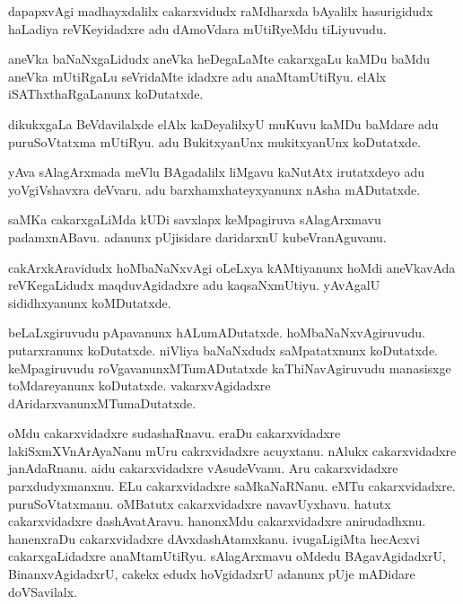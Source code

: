\documentclass{article}
\begin{document}
\begin{mn}%
dapapxvAgi madhayxdalilx cakarxvidudx raMdharxda bAyalilx hasurigidudx haLadiya reVKeyidadxre adu 
dAmoVdara mUtiRyeMdu tiLiyuvudu.
\end{mn}

\begin{mn}%
aneVka baNaNxgaLidudx aneVka heDegaLaMte cakarxgaLu kaMDu baMdu aneVka mUtiRgaLu seVridaMte 
idadxre adu anaMtamUtiRyu. elAlx iSAThxthaRgaLanunx koDutatxde.
\end{mn}

\begin{mn}%
dikukxgaLa BeVdavilalxde elAlx kaDeyalilxyU muKuvu kaMDu baMdare adu puruSoVtatxma mUtiRyu. adu 
BukitxyanUnx mukitxyanUnx koDutatxde.
\end{mn}

\begin{mn}%
yAva sAlagArxmada meVlu BAgadalilx liMgavu kaNutAtx irutatxdeyo adu yoVgiVshavxra deVvaru. adu 
barxhamxhateyxyanunx nAsha mADutatxde.
\end{mn}

\begin{mn}%
saMKa cakarxgaLiMda kUDi savxlapx keMpagiruva sAlagArxmavu padamxnABavu. adanunx pUjisidare 
daridarxnU kubeVranAguvanu. 
\end{mn}

\begin{mn}%
cakArxkAravidudx hoMbaNaNxvAgi oLeLxya kAMtiyanunx hoMdi aneVkavAda reVKegaLidudx maqduvAgidadxre 
adu kaqsaNxmUtiyu. yAvAgalU sididhxyanunx koMDutatxde.
\end{mn}

\begin{mn}%
beLaLxgiruvudu pApavanunx hALumADutatxde. hoMbaNaNxvAgiruvudu. putarxranunx koDutatxde. niVliya 
baNaNxdudx saMpatatxnunx koDutatxde. keMpagiruvudu roVgavanunxMTumADutatxde kaThiNavAgiruvudu 
manasisxge toMdareyanunx koDutatxde. vakarxvAgidadxre dAridarxvanunxMTumaDutatxde.
\end{mn}

\begin{mn}%
oMdu cakarxvidadxre sudashaRnavu. eraDu cakarxvidadxre lakiSxmXVnArAyaNanu mUru cakrxvidadxre 
acuyxtanu. nAlukx cakarxvidadxre janAdaRnanu. aidu cakarxvidadxre vAsudeVvanu. Aru cakarxvidadxre 
parxdudyxmanxnu. ELu cakarxvidadxre saMkaNaRNanu. eMTu cakarxvidadxre. puruSoVtatxmanu. oMBatutx 
cakarxvidadxre navavUyxhavu. hatutx cakarxvidadxre dashAvatAravu. hanonxMdu cakarxvidadxre 
anirudadhxnu. hanenxraDu cakarxvidadxre dAvxdashAtamxkanu. ivugaLigiMta hecAcxvi cakarxgaLidadxre 
anaMtamUtiRyu. sAlagArxmavu oMdedu BAgavAgidadxrU, BinanxvAgidadxrU, cakekx edudx hoVgidadxrU 
adanunx pUje mADidare doVSavilalx.
\end{mn}
\end{document}
